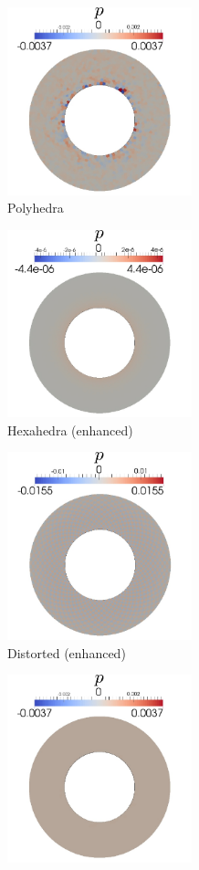 \begin{figure}[!h]
\begin{subfigure}[b]{0.32\linewidth}
            \centering
            \includegraphics[width=2.1in]{figures/poly_pressure.pdf}
    			\caption{Polyhedra \label{fig:poly_pressure}}
    \end{subfigure}
    \begin{subfigure}[b]{0.32\linewidth}
            \centering
            \includegraphics[width=2.1in]{figures/hex_fbar_pressure.pdf}
    			\caption{Hexahedra (enhanced) \label{fig:hex_fbar_pressure}}
    \end{subfigure}
	\begin{subfigure}[b]{0.32\linewidth}
            \centering
            \includegraphics[width=2.1in]{figures/hexp_fbar_pressure.pdf}
    			\caption{Distorted (enhanced) \label{fig:hexp_fbar_pressure}}
    \end{subfigure} 
    \begin{subfigure}[b]{0.32\linewidth}
            \centering
            \includegraphics[width=2.1in]{figures/poly_fbar_pressure.pdf}

\end{subfigure}
\end{figure}

